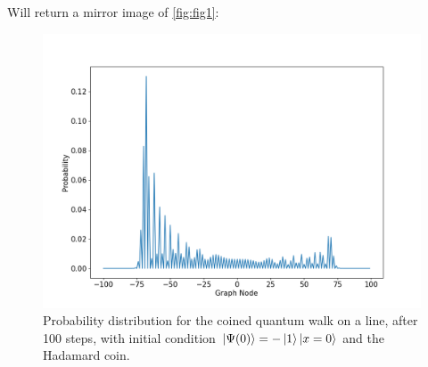                 Will return a mirror image of \ref{fig:fig1}:
    	        \begin{figure}[!h]
                    \centering
                    \includegraphics[scale=0.40]{img/CoinedQW/Coinedpsi01.png}
                    \caption{Probability distribution for the coined quantum walk on a line, after 100 steps, with initial condition $\ket{\Psi(0)}=-\ket{1}\ket{x=0}$ and the Hadamard coin.} 
                    \label{fig:fig2}
                \end{figure}
                
